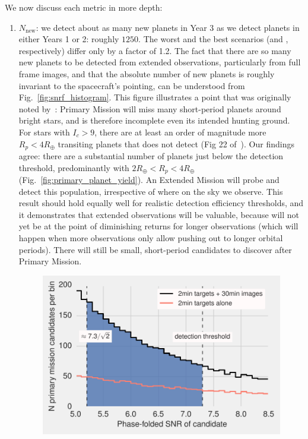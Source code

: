We now discuss each metric in more depth:
\begin{enumerate}
	\item $N_\mathrm{new}$: we detect about as many new planets in Year 3 as we detect planets in either Years 1 or 2: roughly $1250$.
	The worst and the best scenarios (\elong\:and \hemis, respectively) differ only by a factor of 1.2.
	The fact that there are so many new planets to be detected from extended observations, particularly from full frame images, and that the absolute number of new planets is roughly invariant to the spacecraft's pointing, can be understood from Fig.~\ref{fig:snrf_histogram}.
	This figure illustrates a point that was originally noted by~:
        \tesss Primary Mission will miss many short-period planets around bright stars, and is therefore
        incomplete even its intended hunting ground.
        For stars with $I_c>9$, there are at least an order of magnitude more $R_p<4R_\oplus$ transiting planets that \tess does not detect (Fig 22 of~).
	Our findings agree: there are a substantial number of planets just below the detection threshold, predominantly with $2R_\oplus < R_p <4R_\oplus$ (Fig.~\ref{fig:primary_planet_yield}).
	An Extended Mission will probe and detect this population, irrespective of where on the sky we observe.
	This result should hold equally well for realistic detection efficiency thresholds, and it demonstrates that extended observations will be valuable, because \tess will not yet be at the point of diminishing returns for longer observations (which will happen when more observations only allow pushing out to longer orbital periods). 
	There will still be small, short-period candidates to discover after \tesss Primary Mission.
\begin{figure}[!t]
	\centering
	\includegraphics[scale=1.]{figures/snrf_histogram_with_ps.pdf}

\end{figure}
\end{enumerate}
